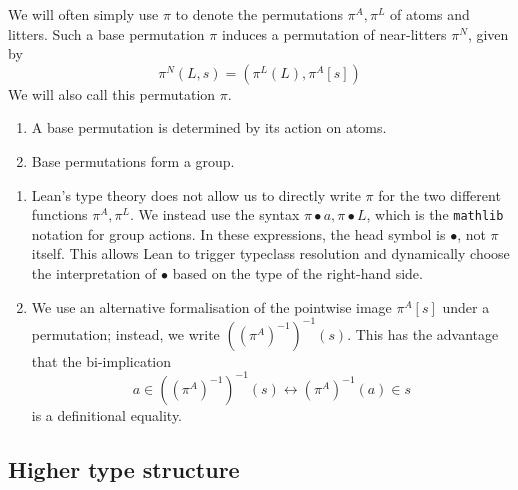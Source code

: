 We will often simply use \( \pi \) to denote the permutations \( \pi^A, \pi^L \) of atoms and litters.
Such a base permutation \( \pi \) induces a permutation of near-litters \( \pi^N \), given by
\[ \pi^N(L, s) = (\pi^L(L), \pi^A[s]) \]
We will also call this permutation \( \pi \).
\begin{remarks}\mbox\negthinspace
    \begin{enumerate}
        \item {}
        A base permutation is determined by its action on atoms.
        \item {}
        Base permutations form a group.
    \end{enumerate}
\end{remarks}
\begin{details}\mbox\negthinspace
    \begin{enumerate}
        \item Lean's type theory does not allow us to directly write \( \pi \) for the two different functions \( \pi^A, \pi^L \).
        We instead use the syntax \( \pi \bullet a, \pi \bullet L \), which is the \texttt{mathlib} notation for group actions.
        In these expressions, the head symbol is \( \bullet \), not \( \pi \) itself.
        This allows Lean to trigger typeclass resolution and dynamically choose the interpretation of \( \bullet \) based on the type of the right-hand side.
        \item We use an alternative formalisation of the pointwise image \( \pi^A[s] \) under a permutation; instead, we write \( ((\pi^A)^{-1})^{-1}(s) \).
        This has the advantage that the bi-implication
        \[ a \in ((\pi^A)^{-1})^{-1}(s) \leftrightarrow (\pi^A)^{-1}(a) \in s \]
        is a definitional equality.
    \end{enumerate}
\end{details}

\subsection{Higher type structure}


